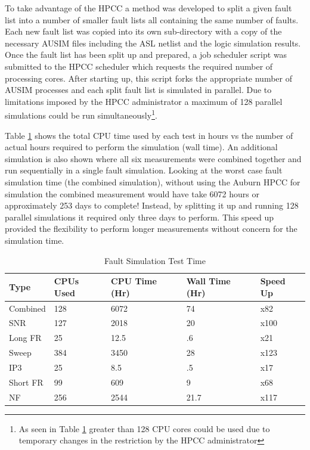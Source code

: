 \documentclass[12pt]{report}
\begin{document}
To take advantage of the HPCC a method was developed to split a given fault list into a number of smaller fault lists all containing the same number of faults.  Each new fault list was copied into its own sub-directory with a copy of the necessary AUSIM files including the ASL netlist and the logic simulation results.  Once the fault list has been split up and prepared, a job scheduler script was submitted to the HPCC scheduler which requests the required number of processing cores.  After starting up, this script forks the appropriate number of AUSIM processes and each split fault list is simulated in parallel.  Due to limitations imposed by the HPCC administrator a maximum of 128 parallel simulations could be run simultaneously\footnote{As seen in Table \ref{tbl:faulttesttime} greater than 128 CPU cores could be used due to temporary changes in the restriction by the HPCC administrator}.  

Table \ref{tbl:faulttesttime} shows the total CPU time used by each test in hours vs the number of actual hours required to perform the simulation (wall time).  An additional simulation is also shown where all six measurements were combined together and run sequentially in a single fault simulation.  Looking at the worst case fault simulation time (the combined simulation), without using the Auburn HPCC for simulation the combined measurement would have take 6072 hours or approximately 253 days to complete! Instead, by splitting it up and running 128 parallel simulations it required only three days to perform.  This speed up provided the flexibility to perform longer measurements without concern for the simulation time.
\begin{table}
  \begin{center}
    \caption{Fault Simulation Test Time}
    \begin{tabular}{|l|l|l|l|l|}
      \hline
      Type & CPUs Used & CPU Time (Hr) & Wall Time (Hr) & Speed Up \\ \hline
      Combined & 128 & 6072 & 74 & x82 \\ \hline
      SNR & 127 & 2018 & 20 & x100 \\ \hline
      Long FR & 25 & 12.5 & .6 & x21 \\ \hline
      Sweep & 384 & 3450 & 28 & x123 \\ \hline
      IP3 & 25 & 8.5 & .5 & x17 \\ \hline
      Short FR & 99 & 609 & 9 & x68 \\ \hline
      NF & 256 & 2544 & 21.7 & x117 \\
      \hline
    \end{tabular}
  \label{tbl:faulttesttime}
  \end{center}
\end{table}
\end{document}
